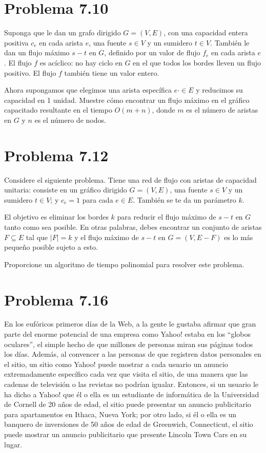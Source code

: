 \documentclass{article}
\begin{document}
\section*{Problema 7.10}

Suponga que le dan un grafo dirigido $G = (V , E)$, con una capacidad entera
positiva $c_e$ en cada arista $e$, una fuente $s \in V$ y un sumidero $t \in V$.
También le dan un flujo máximo $s-t$ en $G$, definido por un valor de flujo
$f_e$ en cada arista $e$. El flujo $f$ es acíclico: no hay ciclo en $G$ en el
que todos los bordes lleven un flujo positivo. El flujo $f$ también tiene un
valor entero.

Ahora supongamos que elegimos una arista específica $e \cdot \in E$ y reducimos su
capacidad en 1 unidad. Muestre cómo encontrar un flujo máximo en el gráfico
capacitado resultante en el tiempo $O(m + n)$, donde $m$ es el número de aristas en
$G$ y $n$ es el número de nodos.

\section*{Problema 7.12}

Considere el siguiente problema. Tiene una red de flujo con aristas de capacidad
unitaria: consiste en un gráfico dirigido $G = (V , E)$, una fuente $s \in V$ y
un sumidero $t \in V$; y $c_e = 1$ para cada $e \in E$. También se te da un
parámetro $k$.

El objetivo es eliminar los bordes $k$ para reducir el flujo máximo de $s-t$ en
$G$ tanto como sea posible. En otras palabras, debes encontrar un conjunto de
aristas $F \subseteq E$ tal que $|F| = k$ y el flujo máximo de $s-t$ en $G = (V
, E - F)$ es lo más pequeño posible sujeto a esto.

Proporcione un algoritmo de tiempo polinomial para resolver este problema.

\section*{Problema 7.16}
En los eufóricos primeros días de la Web, a la gente le gustaba afirmar que gran
parte del enorme potencial de una empresa como Yahoo! estaba en los “globos
oculares”, el simple hecho de que millones de personas miran sus páginas todos
los días. Además, al convencer a las personas de que registren datos personales
en el sitio, un sitio como Yahoo! puede mostrar a cada usuario un anuncio
extremadamente específico cada vez que visita el sitio, de una manera que las
cadenas de televisión o las revistas no podrían igualar. Entonces, si un usuario
le ha dicho a Yahoo! que él o ella es un estudiante de informática de la
Universidad de Cornell de 20 años de edad, el sitio puede presentar un anuncio
publicitario para apartamentos en Ithaca, Nueva York; por otro lado, si él o
ella es un banquero de inversiones de 50 años de edad de Greenwich, Connecticut,
el sitio puede mostrar un anuncio publicitario que presente Lincoln Town Cars en
su lugar.
\end{document}
